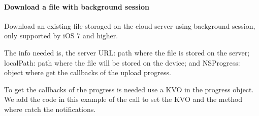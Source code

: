 \documentclass[letterpaper,10pt,english]{sphinxmanual}
\begin{document}
\paragraph{Download a file with background session}
\label{ios_library/examples:download-a-file-with-background-session}
Download an existing file storaged on the cloud server using background session, only supported by iOS 7 and higher.

The info needed is, the server URL: path where the file is stored on the server; localPath: path where the file will be stored on the device; and NSProgress: object where get the callbacks of the upload progress.

To get the callbacks of the progress is needed use a KVO in the progress object. We add the code in this example of the call to set the KVO and the method where catch the notifications.
\end{document}

